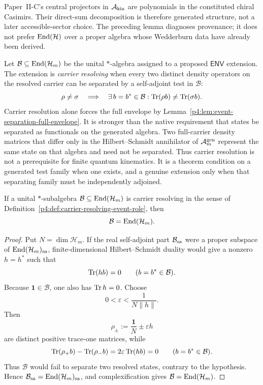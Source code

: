 \documentclass[12pt,a4paper]{article}
\begin{document}
\begin{remark}
Paper~II-C's central projectors in \(\mathcal A_{\rm kin}\) are polynomials in
the constituted chiral Casimirs.  Their direct-sum decomposition is therefore
generated structure, not a later accessible-sector choice.  The preceding
lemma diagnoses provenance; it does not prefer \(\operatorname{End}(\mathcal H)\) over a
proper algebra whose Wedderburn data have already been derived.
\end{remark}

\begin{definition}
\label{p4:def:carrier-resolving-event-role}
Let \(\mathcal B\subseteq\operatorname{End}(\mathcal H_m)\) be the unital \(*\)-algebra
assigned to a proposed \(\mathsf{ENV}\) extension.  The extension is
\emph{carrier resolving} when every two distinct density operators on the
resolved carrier can be separated by a self-adjoint test in \(\mathcal B\):
\[
\rho\ne\sigma
\quad\Longrightarrow\quad
\exists\,b=b^*\in\mathcal B:
\operatorname{Tr}(\rho b)\ne\operatorname{Tr}(\sigma b).
\]
Carrier resolution alone forces the full envelope by
Lemma~\ref{p4:lem:event-separation-full-envelope}.  It is stronger than the
native requirement that states be separated as functionals on the generated
algebra.  Two full-carrier density matrices that differ only in the
Hilbert--Schmidt annihilator of \(\mathcal A_m^{\rm gen}\) represent the same
state on that algebra and need not be separated.  Thus carrier resolution is
not a prerequisite for finite quantum kinematics.  It is a theorem condition
on a generated test family when one exists, and a genuine extension only when
that separating family must be independently adjoined.
\end{definition}

\begin{lemma}
\label{p4:lem:event-separation-full-envelope}
If a unital \(*\)-subalgebra
\(\mathcal B\subseteq\operatorname{End}(\mathcal H_m)\) is carrier resolving in the sense of
Definition~\ref{p4:def:carrier-resolving-event-role}, then
\[
\mathcal B=\operatorname{End}(\mathcal H_m).
\]
\end{lemma}

\begin{proof}
Put \(N=\dim\mathcal H_m\).  If the real self-adjoint part
\(\mathcal B_{\rm sa}\) were a proper subspace of
\(\operatorname{End}(\mathcal H_m)_{\rm sa}\), finite-dimensional Hilbert--Schmidt duality
would give a nonzero \(h=h^*\) such that
\[
\operatorname{Tr}(hb)=0\qquad(b=b^*\in\mathcal B).
\]
Because \(\mathbf1\in\mathcal B\), one also has \(\operatorname{Tr} h=0\).  Choose
\[
0<\varepsilon<\frac{1}{N\|h\|}.
\]
Then
\[
\rho_\pm:=\frac{\mathbf1}{N}\pm\varepsilon h
\]
are distinct positive trace-one matrices, while
\[
\operatorname{Tr}(\rho_+b)-\operatorname{Tr}(\rho_-b)=2\varepsilon\operatorname{Tr}(hb)=0
\qquad(b=b^*\in\mathcal B).
\]
Thus \(\mathcal B\) would fail to separate two resolved states, contrary to
the hypothesis.  Hence
\(\mathcal B_{\rm sa}=\operatorname{End}(\mathcal H_m)_{\rm sa}\), and complexification
gives \(\mathcal B=\operatorname{End}(\mathcal H_m)\).
\end{proof}
\end{document}
